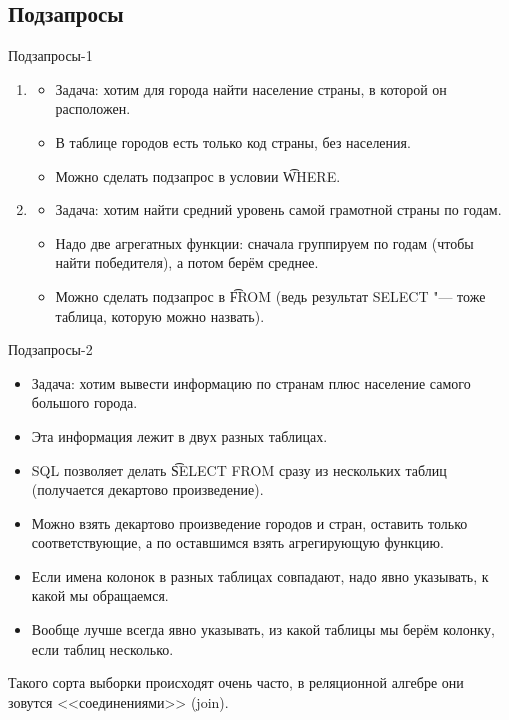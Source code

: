 \subsection{Подзапросы}
\begin{frame}
\end{frame}

\begin{frame}{Подзапросы-1}
	\begin{enumerate}
		\item
			\begin{itemize}
				\item Задача: хотим для города найти население страны, в которой он расположен.
				\item В таблице городов есть только код страны, без населения.
				\item Можно сделать подзапрос в условии \t{WHERE}.
			\end{itemize}
		\item
			\begin{itemize}
				\item Задача: хотим найти средний уровень самой грамотной страны по годам.
				\item Надо две агрегатных функции: сначала группируем по годам (чтобы найти победителя), а потом берём среднее.
				\item Можно сделать подзапрос в \t{FROM} (ведь результат SELECT "--- тоже таблица, которую можно назвать).
			\end{itemize}
	\end{enumerate}
\end{frame}

\begin{frame}{Подзапросы-2}
	\begin{itemize}
		\item Задача: хотим вывести информацию по странам плюс население самого большого города.
		\item Эта информация лежит в двух разных таблицах.
		\item SQL позволяет делать \t{SELECT FROM} сразу из нескольких таблиц (получается декартово произведение).
		\item Можно взять декартово произведение городов и стран, оставить только соответствующие, а по оставшимся взять агрегирующую функцию.
		\item Если имена колонок в разных таблицах совпадают, надо явно указывать, к какой мы обращаемся.
		\item Вообще лучше всегда явно указывать, из какой таблицы мы берём колонку, если таблиц несколько.
	\end{itemize}
	Такого сорта выборки происходят очень часто, в реляционной алгебре они зовутся <<соединениями>> (join).
\end{frame}


